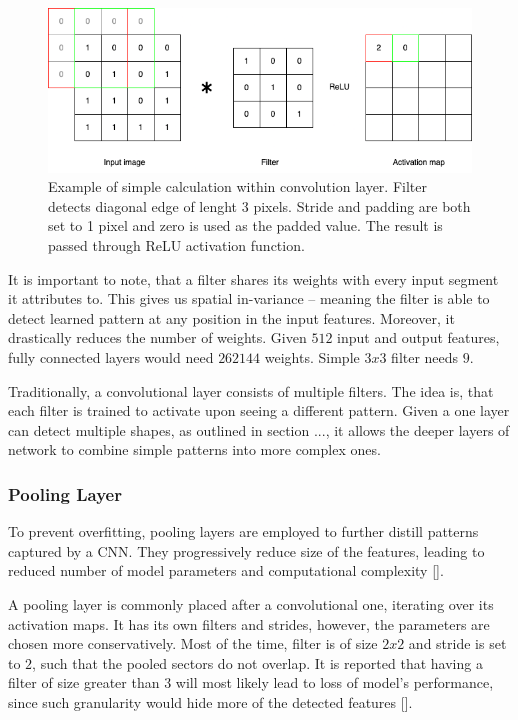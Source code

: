 \begin{figure}[!h]
    \begin{center}
    \begin{minipage}{0.75\textwidth}
      \includegraphics[width=\textwidth]{img/cnn-conv.png}
    \end{minipage}
    \caption{Example of simple calculation within convolution layer. Filter detects diagonal edge of lenght 3 pixels. Stride and padding are both set to 1 pixel and zero is used as the padded value. The result is passed through ReLU activation function.}
    \label{fig:cnn-convolution}
    \end{center}
\end{figure}

It is important to note, that a filter shares its weights with every input segment it attributes to. This gives us spatial in-variance -- meaning the filter is able to detect learned pattern at any position in the input features. Moreover, it drastically reduces the number of weights. Given $512$ input and output features, fully connected layers would need $262144$ weights. Simple $3x3$ filter needs $9$.

Traditionally, a convolutional layer consists of multiple filters. The idea is, that each filter is trained to activate upon seeing a different pattern. Given a one layer can detect multiple shapes, as outlined in section ..., it allows the deeper layers of network to combine simple patterns into more complex ones.

\subsubsection{Pooling Layer}

To prevent overfitting, pooling layers are employed to further distill patterns captured by a CNN. They progressively reduce size of the features, leading to reduced number of model parameters and computational complexity [].

A pooling layer is commonly placed after a convolutional one, iterating over its activation maps. It has its own filters and strides, however, the parameters are chosen more conservatively. Most of the time, filter is of size $2x2$ and stride is set to $2$, such that the pooled sectors do not overlap. It is reported that having a filter of size greater than 3 will most likely lead to loss of model's performance, since such granularity would hide more of the detected features [].

